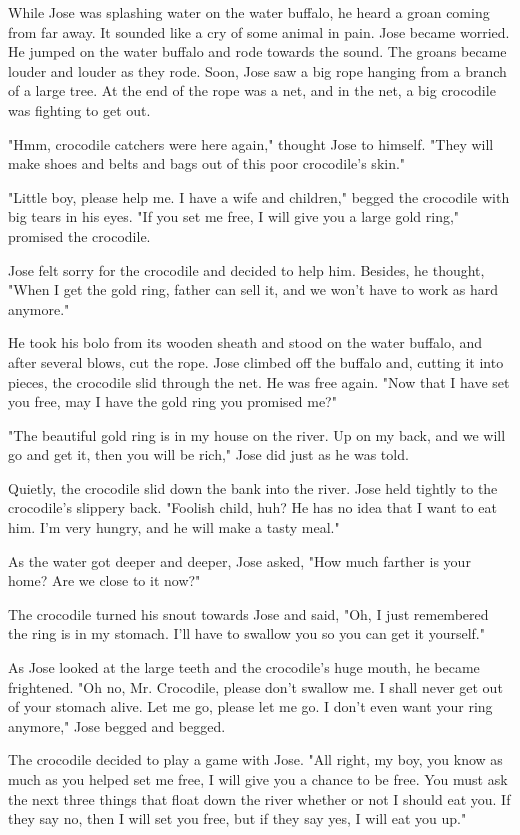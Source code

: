 While Jose was splashing water on the water buffalo, he heard a groan coming from far away. It sounded like a cry of some animal in pain. Jose became worried. He jumped on the water buffalo and rode towards the sound. The groans became louder and louder as they rode. Soon, Jose saw a big rope hanging from a branch of a large tree. At the end of the rope was a net, and in the net, a big crocodile was fighting to get out.

"Hmm, crocodile catchers were here again," thought Jose to himself. "They will make shoes and belts and bags out of this poor crocodile's skin."

"Little boy, please help me. I have a wife and children," begged the crocodile with big tears in his eyes. "If you set me free, I will give you a large gold ring," promised the crocodile.

Jose felt sorry for the crocodile and decided to help him. Besides, he thought, "When I get the gold ring, father can sell it, and we won't have to work as hard anymore."

He took his bolo from its wooden sheath and stood on the water buffalo, and after several blows, cut the rope. Jose climbed off the buffalo and, cutting it into pieces, the crocodile slid through the net. He was free again. "Now that I have set you free, may I have the gold ring you promised me?"

"The beautiful gold ring is in my house on the river. Up on my back, and we will go and get it, then you will be rich," Jose did just as he was told.

Quietly, the crocodile slid down the bank into the river. Jose held tightly to the crocodile's slippery back. "Foolish child, huh? He has no idea that I want to eat him. I'm very hungry, and he will make a tasty meal."

As the water got deeper and deeper, Jose asked, "How much farther is your home? Are we close to it now?"

The crocodile turned his snout towards Jose and said, "Oh, I just remembered the ring is in my stomach. I'll have to swallow you so you can get it yourself."

As Jose looked at the large teeth and the crocodile's huge mouth, he became frightened. "Oh no, Mr. Crocodile, please don't swallow me. I shall never get out of your stomach alive. Let me go, please let me go. I don't even want your ring anymore," Jose begged and begged.

The crocodile decided to play a game with Jose. "All right, my boy, you know as much as you helped set me free, I will give you a chance to be free. You must ask the next three things that float down the river whether or not I should eat you. If they say no, then I will set you free, but if they say yes, I will eat you up."

